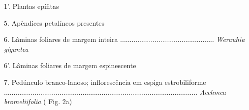 \begin{customList1}
\begin{customList1}
\end{customList1}

\item \par{}1'.\allowbreak{} Plantas epífitas
\begin{customList1}
\item \par{}5.\allowbreak{} Apêndices petalíneos presentes
\begin{customList1}
\item \par{}6.\allowbreak{} Lâminas foliares de margem inteira .\allowbreak{}.\allowbreak{}.\allowbreak{}.\allowbreak{}.\allowbreak{}.\allowbreak{}.\allowbreak{}.\allowbreak{}.\allowbreak{}.\allowbreak{}.\allowbreak{}.\allowbreak{}.\allowbreak{}.\allowbreak{}.\allowbreak{}.\allowbreak{}.\allowbreak{}.\allowbreak{}.\allowbreak{}.\allowbreak{}.\allowbreak{}.\allowbreak{}.\allowbreak{}.\allowbreak{}.\allowbreak{}.\allowbreak{}.\allowbreak{}.\allowbreak{}.\allowbreak{}.\allowbreak{}.\allowbreak{}.\allowbreak{}.\allowbreak{}.\allowbreak{}.\allowbreak{}.\allowbreak{}.\allowbreak{}.\allowbreak{}.\allowbreak{}.\allowbreak{}.\allowbreak{}.\allowbreak{}.\allowbreak{}.\allowbreak{}.\allowbreak{}.\allowbreak{}.\allowbreak{}.\allowbreak{}.\allowbreak{} \textit{Werauhia gigantea }
\item \par{}6'.\allowbreak{} Lâminas foliares de margem espinescente
\begin{customList1}
\item \par{}7.\allowbreak{} Pedúnculo branco-\allowbreak{}lanoso; inflorescência em espiga estrobiliforme .\allowbreak{}.\allowbreak{}.\allowbreak{}.\allowbreak{}.\allowbreak{}.\allowbreak{}.\allowbreak{}.\allowbreak{}.\allowbreak{}.\allowbreak{}.\allowbreak{}.\allowbreak{}.\allowbreak{}.\allowbreak{}.\allowbreak{}.\allowbreak{}.\allowbreak{}.\allowbreak{}.\allowbreak{}.\allowbreak{}.\allowbreak{}.\allowbreak{}.\allowbreak{}.\allowbreak{}.\allowbreak{}.\allowbreak{}.\allowbreak{}.\allowbreak{}.\allowbreak{}.\allowbreak{}.\allowbreak{}.\allowbreak{}.\allowbreak{}.\allowbreak{}.\allowbreak{}.\allowbreak{}.\allowbreak{}.\allowbreak{}.\allowbreak{}.\allowbreak{}.\allowbreak{}.\allowbreak{}.\allowbreak{}.\allowbreak{}.\allowbreak{}.\allowbreak{}.\allowbreak{}.\allowbreak{}.\allowbreak{}.\allowbreak{}.\allowbreak{}.\allowbreak{}.\allowbreak{}.\allowbreak{}.\allowbreak{}.\allowbreak{}.\allowbreak{}.\allowbreak{}.\allowbreak{}.\allowbreak{}.\allowbreak{}.\allowbreak{}.\allowbreak{}.\allowbreak{}.\allowbreak{}.\allowbreak{}.\allowbreak{}.\allowbreak{}.\allowbreak{}.\allowbreak{}.\allowbreak{}.\allowbreak{}.\allowbreak{}.\allowbreak{}.\allowbreak{}.\allowbreak{}.\allowbreak{}.\allowbreak{}.\allowbreak{}.\allowbreak{}.\allowbreak{}.\allowbreak{}.\allowbreak{}.\allowbreak{}.\allowbreak{}.\allowbreak{}.\allowbreak{}.\allowbreak{}.\allowbreak{}.\allowbreak{}.\allowbreak{}.\allowbreak{}.\allowbreak{}.\allowbreak{}.\allowbreak{}.\allowbreak{}.\allowbreak{}.\allowbreak{}.\allowbreak{}.\allowbreak{}.\allowbreak{} \textit{Aechmea bromeliifolia} (\allowbreak{} Fig.\allowbreak{} 2a)\allowbreak{}

\end{customList1}
\end{customList1}
\end{customList1}
\end{customList1}
